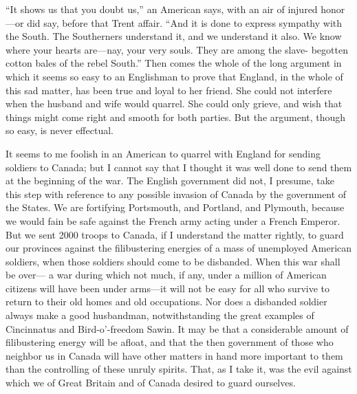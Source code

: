 ``It shows us that you doubt us,'' an American says, with an air of
injured honor---or did say, before that Trent affair.  ``And it is
done to express sympathy with the South.  The Southerners
understand it, and we understand it also.  We know where your
hearts are---nay, your very souls.  They are among the slave-
begotten cotton bales of the rebel South.''  Then comes the whole of
the long argument in which it seems so easy to an Englishman to
prove that England, in the whole of this sad matter, has been true
and loyal to her friend.  She could not interfere when the husband
and wife would quarrel.  She could only grieve, and wish that
things might come right and smooth for both parties.  But the
argument, though so easy, is never effectual.

It seems to me foolish in an American to quarrel with England for
sending soldiers to Canada; but I cannot say that I thought it was
well done to send them at the beginning of the war.  The English
government did not, I presume, take this step with reference to any
possible invasion of Canada by the government of the States.  We
are fortifying Portsmouth, and Portland, and Plymouth, because we
would fain be safe against the French army acting under a French
Emperor.  But we sent 2000 troops to Canada, if I understand the
matter rightly, to guard our provinces against the filibustering
energies of a mass of unemployed American soldiers, when those
soldiers should come to be disbanded.  When this war shall be over---%
a war during which not much, if any, under a million of American
citizens will have been under arms---it will not be easy for all who
survive to return to their old homes and old occupations.  Nor does
a disbanded soldier always make a good husbandman, notwithstanding
the great examples of Cincinnatus and Bird-o'-freedom Sawin.  It
may be that a considerable amount of filibustering energy will be
afloat, and that the then government of those who neighbor us in
Canada will have other matters in hand more important to them than
the controlling of these unruly spirits.  That, as I take it, was
the evil against which we of Great Britain and of Canada desired to
guard ourselves.

